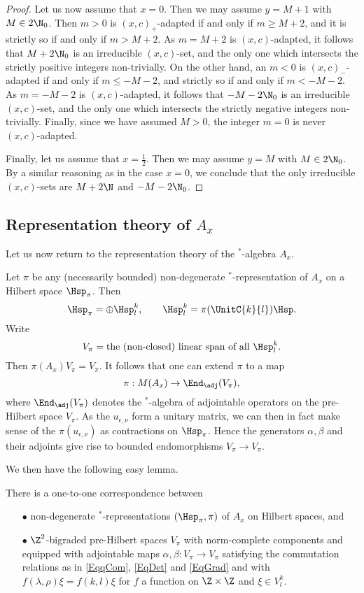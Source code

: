 \begin{proof}
Let us now assume that $x=0$. Then we may assume $y=M+1$ with $M\in 2\N_0$. Then $m>0$ is $(x,c)_+$-adapted if and only if $m\geq M+2$, and it is strictly so if and only if $m>M+2$. As $m=M+2$ is $(x,c)$-adapted, it follows that $M+2\N_0$ is an irreducible $(x,c)$-set, and the only one which intersects the strictly positive integers non-trivially. On the other hand, an $m<0$ is $(x,c)_-$-adapted if and only if $m\leq -M-2$, and strictly so if and only if $m<-M-2$. As $m=-M-2$ is $(x,c)$-adapted, it follows that $-M-2\N_0$ is an irreducible $(x,c)$-set, and the only one which intersects the strictly negative integers non-trivially. Finally, since we have assumed $M>0$, the integer $m=0$ is never $(x,c)$-adapted.

Finally, let us assume that $x=\frac{1}{2}$. Then we may assume $y=M$ with $M\in 2\N_0$. By a similar reasoning as in the case $x=0$, we conclude that the only irreducible $(x,c)$-sets are $M+2\N$ and $-M-2\N_0$.
\end{proof} 

\subsection{Representation theory of $A_x$}

Let us now return to the representation theory of the $^*$-algebra $A_x$.

Let $\pi$ be any (necessarily bounded) non-degenerate $^*$-representation of $A_x$ on a Hilbert space $\Hsp_{\pi}$. Then \[\Hsp_{\pi} = \oplus \Hsp^{k}_{l},\qquad \Hsp^{k}_{l} = \pi(\UnitC{k}{l})\Hsp.\] Write \[V_{\pi} =  \textrm{the (non-closed) linear span of all }\Hsp^{k}_{l}.\] Then $\pi(A_x)V_{\pi} = V_{\pi}$. It follows that one can extend $\pi$ to a map \[\pi: M(A_x) \rightarrow \End_{\adj}(V_{\pi}),\] where $\End_{\adj}(V_{\pi})$ denotes the $^*$-algebra of adjointable operators on the pre-Hilbert space $V_{\pi}$. As the $u_{\epsilon,\nu}$ form a unitary matrix, we can then in fact make sense of the $\pi(u_{\epsilon,\nu})$ as contractions on $\Hsp_{\pi}$. Hence the generators $\alpha,\beta$ and their adjoints give rise to bounded endomorphisms $V_{\pi}\rightarrow V_{\pi}$.

We then have the following easy lemma.

\begin{Lem} There is a one-to-one correspondence between\begin{itemize}\item[$\bullet$] non-degenerate $^*$-representations $(\Hsp_{\pi},\pi)$ of $A_x$ on Hilbert spaces, and 
\item[$\bullet$] $\Z^2$-bigraded pre-Hilbert spaces $V_{\pi}$ with norm-complete components and equipped with adjointable maps $\alpha,\beta:V_{\pi}\rightarrow V_{\pi}$ satisfying the commutation relations as in \eqref{EqqCom}, \eqref{EqDet} and \eqref{EqGrad} and with $f(\lambda,\rho)\xi = f(k,l)\xi$ for $f$ a function on $\Z\times \Z$ and $\xi\in V^k_l$.
\end{itemize}
\end{Lem}

